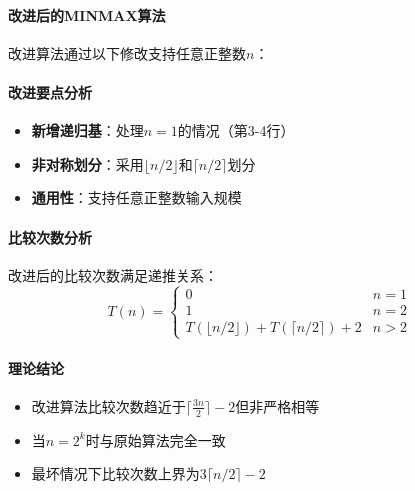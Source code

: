 \documentclass[./../main.tex]{subfiles}
\begin{document}
\paragraph{改进后的MINMAX算法}
改进算法通过以下修改支持任意正整数$n$：

\begin{algorithm}[H]
\caption{Modified MinMax Algorithm (Works for any $n\in\mathbb{N}^+$)}
\end{algorithm}

\paragraph{改进要点分析}
\begin{itemize}
    \item \textbf{新增递归基}：处理$n=1$的情况（第3-4行）
    \item \textbf{非对称划分}：采用$\lfloor n/2 \rfloor$和$\lceil n/2 \rceil$划分
    \item \textbf{通用性}：支持任意正整数输入规模
\end{itemize}

\paragraph{比较次数分析}
改进后的比较次数满足递推关系：
$$
T(n) = \begin{cases} 
0 & n=1 \\
1 & n=2 \\
T(\lfloor n/2 \rfloor) + T(\lceil n/2 \rceil) + 2 & n>2 
\end{cases}
$$


\paragraph{理论结论}
\begin{itemize}
    \item 改进算法比较次数趋近于$\lceil \frac{3n}{2} \rceil -2$但非严格相等
    \item 当$n=2^k$时与原始算法完全一致
    \item 最坏情况下比较次数上界为$3\lceil n/2 \rceil -2$
\end{itemize}
\end{document}
